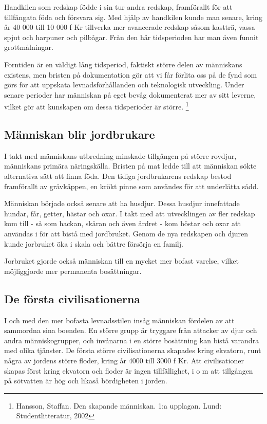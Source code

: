 \documentclass[a4paper,12pt,fleqn]{article}
\begin{document}
Handkilen som redskap födde i sin tur andra redskap, framförallt för att tillfångata föda och försvara sig. Med hjälp av handkilen kunde man senare, kring år 40 000 till 10 000 f Kr tillverka mer avancerade redskap såsom kastträ, vassa spjut och harpuner och pilbågar. Från den här tidsperioden har man även funnit grottmålningar.

Forntiden är en väldigt lång tidsperiod, faktiskt större delen av människans existens, men bristen på dokumentation gör att vi får förlita oss på de fynd som görs för att uppskata levnadsförhållanden och teknologisk utveckling. Under senare perioder har människan på eget bevåg dokumenterat mer av sitt leverne, vilket gör att kunskapen om dessa tidsperioder är större. \footnote{Hansson, Staffan. Den skapande människan. 1:a upplagan. Lund: Studentlitteratur, 2002}

\subsection{Människan blir jordbrukare}
I takt med människans utbredning minskade tillgången på större rovdjur, människans primära näringskälla. Bristen på mat ledde till att människan sökte alternativa sätt att finna föda. Den tidiga jordbrukarens redskap bestod framförallt av grävkäppen, en krökt pinne som användes för att underlätta sådd. 

Människan började också senare att ha husdjur. Dessa husdjur innefattade hundar, får, getter, hästar och oxar. I takt med att utvecklingen av fler redskap kom till - så som hackan, skäran och även årdret -  kom höstar och oxar att användas i för att bistå med jordbruket. Genom de nya redskapen och djuren kunde jorbruket öka i skala och bättre försörja en familj. 

Jorbruket gjorde också människan till en mycket mer bofast varelse, vilket möjliggjorde mer permanenta bosättningar. 

\subsection{De första civilisationerna}

I och med den mer bofasta levnadsstilen insåg människan fördelen av att sammordna sina boenden. En större grupp är tryggare från attacker av djur och andra människogrupper, och invånarna i en större bosättning kan bistå varandra med olika tjänster. De första större civilisationerna skapades kring ekvatorn, runt några av jordens större floder, kring år 4000 till 3000 f Kr. Att civilisationer skapas först kring ekvatorn och floder är ingen tillfällighet, i o m att tillgången på sötvatten är hög och likaså bördigheten i jorden. 
\end{document}
